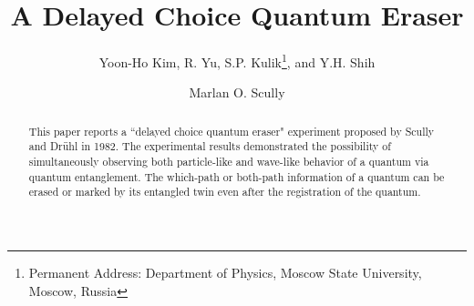 \documentclass[pra,aps,epsf,12pt]{revtex4-2}
\begin{document}
\draft
\title{A Delayed Choice Quantum Eraser}
\author{Yoon-Ho Kim, R. Yu, S.P. Kulik\thanks{Permanent Address: Department of Physics,
Moscow State University, Moscow, Russia}, and Y.H. Shih}
\address{Department of Physics, University of Maryland, Baltimore County,\\
Baltimore, MD 21250}
\author{Marlan O. Scully}
\address{Department of Physics, Texas A \& M University, College Station, TX 77842\\
and Max-Planck Institut f\"{u}r Quantenoptik, M\"{u}nchen, Germany\\(submitted to PRL)}


\begin{abstract}
This paper reports a ``delayed choice quantum eraser" experiment proposed by Scully and
Dr\"{u}hl in 1982. The experimental results demonstrated the possibility of
simultaneously observing both particle-like and wave-like behavior of a quantum via
quantum entanglement. The which-path or both-path information of a quantum can be erased
or marked by its entangled twin even after the registration of the quantum.
\end{abstract}


\maketitle

\newpage
\end{document}
